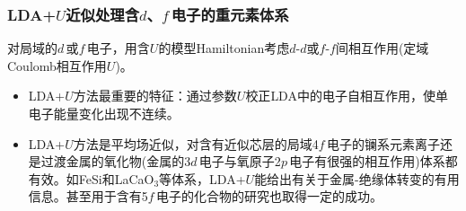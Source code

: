 \documentclass[cjk,slidestop,compress,mathserif,blue]{beamer}
\newcommand{\upcite}[1]{\hspace{0ex}\textsuperscript{\cite{#1}}} %
\begin{document}
\frame
{
\frametitle{LDA+$U$近似处理含$d$、$f$\,电子的重元素体系}
对局域的$d$\,或$f$\,电子，用含\textrm{$U$}的模型\textrm{Hamiltonian}考虑$d$-$d$或$f$-$f$间相互作用(定域\textrm{Coulomb}相互作用\textrm{$U$})。%
\begin{itemize}
\setlength{\itemsep}{10pt}
	\item \textrm{LDA+$U$}方法最重要的特征：通过参数\textrm{$U$}校正\textrm{LDA}中的电子自相互作用，使单电子能量变化出现不连续。%
	\item \textrm{LDA+$U$}方法是平均场近似，对含有近似芯层的局域4$f$\,电子的镧系元素离子还是过渡金属的氧化物(金属的3$d$\,电子与氧原子2$p$\,电子有很强的相互作用)体系都有效。如\textrm{FeSi}和\textrm{LaCaO$_3$}等体系，\textrm{LDA+$U$}能给出有关于金属-绝缘体转变的有用信息。甚至用于含有5$f$\,电子的化合物的研究也取得一定的成功。
\end{itemize}
}
\end{document}
